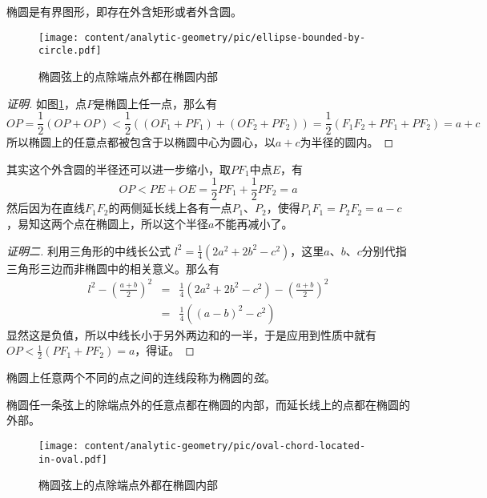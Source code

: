 \begin{property}
  椭圆是有界图形，即存在外含矩形或者外含圆。
\end{property}

\begin{figure}[htbp]
  \centering
\texttt{[image: content/analytic-geometry/pic/ellipse-bounded-by-circle.pdf]}
\caption{椭圆弦上的点除端点外都在椭圆内部}
\label{fig:ellipse-bounded-by-circle}
\end{figure}

\begin{proof}[证明]
  如图\ref{fig:ellipse-bounded-by-circle}，点$P$是椭圆上任一点，那么有
  \begin{equation*}
    OP = \frac{1}{2}(OP + OP) < \frac{1}{2} ((OF_1+PF_1) + (OF_2+PF_2))
    = \frac{1}{2} (F_1F_2 + PF_1 + PF_2) = a+c
  \end{equation*}
  所以椭圆上的任意点都被包含于以椭圆中心为圆心，以$a+c$为半径的圆内。
\end{proof}

  其实这个外含圆的半径还可以进一步缩小，取$PF_1$中点$E$，有
  \begin{equation*}
    OP < PE + OE = \frac{1}{2} PF_1 + \frac{1}{2} PF_2 = a
  \end{equation*}
  然后因为在直线$F_1F_2$的两侧延长线上各有一点$P_1$、$P_2$，使得$P_1F_1=P_2F_2=a-c$，易知这两个点在椭圆上，所以这个半径$a$不能再减小了。

  \begin{proof}[证明二]
    利用三角形的中线长公式 $l^2 = \frac{1}{4}(2a^2+2b^2-c^2)$，这里$a$、$b$、$c$分别代指三角形三边而非椭圆中的相关意义。那么有
    \begin{eqnarray*}
      l^2 - \left( \frac{a+b}{2} \right)^2 & = &  \frac{1}{4}(2a^2+2b^2-c^2) - \left( \frac{a+b}{2} \right)^2 \\
      & = & \frac{1}{4} \left( (a-b)^2 - c^2 \right)
    \end{eqnarray*}
    显然这是负值，所以中线长小于另外两边和的一半，于是应用到性质中就有 $OP < \frac{1}{2} (PF_1+PF_2) = a$，得证。
  \end{proof}

椭圆上任意两个不同的点之间的连线段称为椭圆的\emph{弦}。

\begin{property}
椭圆任一条弦上的除端点外的任意点都在椭圆的内部，而延长线上的点都在椭圆的外部。  
\end{property}

\begin{figure}[htbp]
  \centering
\texttt{[image: content/analytic-geometry/pic/oval-chord-located-in-oval.pdf]}
\caption{椭圆弦上的点除端点外都在椭圆内部}
\label{fig:oval-chord-located-in-oval}
\end{figure}

